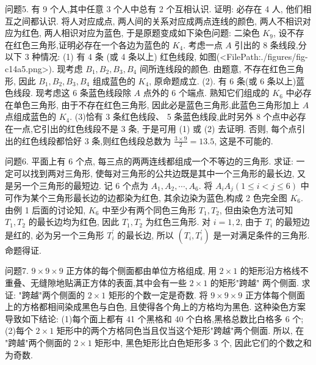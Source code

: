问题5. 有 9 个人,其中任意 3 个人中总有 2 个互相认识.
证明: 必存在 4 人, 他们相互之间都认识.
将人对应成点, 两人间的关系对应成两点连线的颜色, 两人不相识对应为红色, 两人相识对应为蓝色, 于是原题变成如下染色问题:
二染色 $K_9$, 设不存在红色三角形,证明必存在一个各边为蓝色的 $K_4$.
考虑一点 $A$ 引出的 8 条线段,分以下 3 种情况:
(1) 有 4 条 (或 4 条以上) 红色线段, 如图(<FilePath:./figures/fig-c14a5.png>). 现考虑 $B_1, B_2, B_3, B_4$ 间所连线段的颜色.
由题意, 不存在红色三角形, 因此 $B_1, B_2, B_3, B_4$ 组成蓝色的 $K_4$, 原命题成立.
(2). 有 6 条(或 6 条以上)蓝色线段.
现考虑这 6 条蓝色线段除 $A$ 点外的 6 个端点.
熟知它们组成的 $K_6$ 中必存在单色三角形, 由于不存在红色三角形, 因此必是蓝色三角形,此蓝色三角形加上 $A$ 点组成蓝色的 $K_4$.
(3)恰有 3 条红色线段、 5 条蓝色线段,此时另外 8 个点中必存在一点,它引出的红色线段不是 3 条, 于是可用 (1) 或 (2) 去证明.
否则, 每个点引出的红色线段都恰好 3 条,则红色线段总数为 $\frac{3 \times 9}{2}=13.5$, 这是不可能的.



问题6. 平面上有 6 个点, 每三点的两两连线都组成一个不等边的三角形.
求证: 一定可以找到两对三角形, 使每对三角形的公共边既是其中一个三角形的最长边, 又是另一个三角形的最短边.
记 6 个点为 $A_1, A_2, \cdots, A_6$. 将 $A_i A_j(1 \leqslant i<j \leqslant 6)$ 中可作为某个三角形最长边的边都染为红色, 其余边染为蓝色,构成 2 色完全图 $K_6$.
由例 1 后面的讨论知, $K_6$ 中至少有两个同色三角形 $T_1, T_2$, 但由染色方法可知 $T_1, T_2$ 的最长边均为红色, 因此 $T_1, T_2$ 为红色三角形.
对 $i=1,2$, 由于 $T_i$ 的最短边是红的, 必为另一个三角形 $T_i^{\prime}$ 的最长边, 所以 $\left(T_i, T_i^{\prime}\right)$ 是一对满足条件的三角形.
命题得证.



问题7. $9 \times 9 \times 9$ 正方体的每个侧面都由单位方格组成, 用 $2 \times 1$ 的矩形沿方格线不重叠、无缝隙地贴满正方体的表面,其中会有一些 $2 \times 1$ 的矩形"跨越" 两个侧面.
求证: "跨越"两个侧面的 $2 \times 1$ 矩形的个数一定是奇数.
将 $9 \times 9 \times 9$ 正方体每个侧面上的方格都相间染成黑色与白色, 且使得各个角上的方格均为黑色.
这种染色方案导致如下结论:
(1)每个面上都有 41 个黑格和 40 个白格,黑格总数比白格多 6 个;
(2)每个 $2 \times 1$ 矩形中的两个方格同色当且仅当这个矩形"跨越"两个侧面.
所以, 在 "跨越"两个侧面的 $2 \times 1$ 矩形中, 黑色矩形比白色矩形多 3 个, 因此它们的个数之和为奇数.



